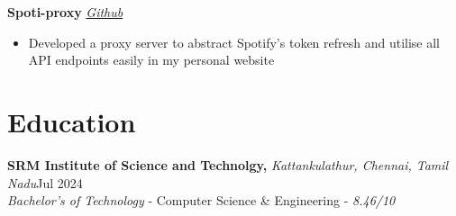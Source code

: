 \documentclass[11pt]{article}       %
\begin{document}
\textbf{Spoti-proxy} \hfill \href{https://github.com/apparentlyarhm/spotify-proxy}{\textit{Github}} \\
\vspace{-9pt}
\begin{itemize}
    \item {Developed a proxy server to abstract Spotify's token refresh and utilise all API endpoints easily in my personal website}
\end{itemize}


\vspace{-18.5pt}

\section*{Education}
\textbf{SRM Institute of Science and Technolgy,} \textit{Kattankulathur, Chennai, Tamil Nadu}\hfill Jul 2024 \\
\textit{Bachelor's of Technology} - Computer Science {\&} Engineering - \textit{8.46/10}
\end{document}
